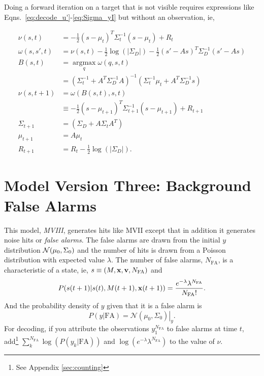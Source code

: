 \documentclass[12pt]{article}
\newcommand{\normal}[2]{{\cal N}(#1,#2)}
\newcommand{\NormalE}[3]{{\mathcal{N}}\left.\left(#1,#2\right)\right|_{#3}}
\newcommand{\ti}[2]{{#1}{(#2)}}                         %
\newcommand{\argmax}{\operatorname*{argmax}}
\begin{document}
Doing a forward iteration on a target that is not visible requires
expressions like Eqns.~\eqref{eq:decode_u'}-\eqref{eq:Sigma_yI} but
without an observation, ie,

\begin{align}
  \nu(s,t) &= -\frac{1}{2}(s-\mu_{t})^T
    \Sigma_{t}^{-1}(s-\mu_{t}) + R_t \nonumber \\
  \omega(s,s',t) &= \nu(s,t) -\frac{1}{2} \log(\left|\Sigma_D\right|)  - 
  \frac{1}{2}(s'-As)^T \Sigma_{D}^{-1} (s'-As)  \nonumber \\
  B(s,t) &= \argmax_{q} \omega(q,s,t) \nonumber \\
  &= \left( \Sigma_t^{-1} + A^T \Sigma_D^{-1} A \right)^{-1} \left(
    \Sigma_t^{-1} \mu_t + A^T \Sigma_D^{-1} s \right) \nonumber \\
  \nu(s,t+1) &= \omega(B(s,t),s,t) \nonumber \\
  &\equiv -\frac{1}{2}(s-\mu_{t+1})^T
  \Sigma_{t+1}^{-1}(s-\mu_{t+1}) + R_{t+1} \nonumber \\
  \label{eq:new_Sigma_noy}
  \Sigma_{t+1} & = \left( \Sigma_D + A \Sigma_tA^T \right) \\
  \label{eq:new_mu_noy}
  \mu_{t+1} &= A \mu_t \\
  \label{eq:new_R_noy}
  R_{t+1} &= R_t -\frac{1}{2}  \log(\left|\Sigma_D\right|).
\end{align}

\section{Model Version Three: Background False Alarms}
\label{sec:model3}

This model, \emph{MVIII}, generates hits like MVII except that in
addition it generates noise hits or \emph{false alarms}.  The false
alarms are drawn from the initial $y$ distribution
$\normal{\mu_0}{\Sigma_0}$ and the number of hits is drawn from a
Poisson distribution with expected value $\lambda$.  The number of
false alarms, $N_{\text{FA}}$, is a characteristic of a state, ie, $s
\equiv (M,{\mathbf{x}},{\mathbf{v}},N_{\text{FA}})$ and
\begin{equation}
  \label{eq:2}
  P(\ti{s}{t+1}|\ti{s}{t},\ti{M}{t+1},\ti{\bx}{t+1}) =
  \frac{e^{-\lambda}\lambda^{N_{\text{FA}}}}{N_{\text{FA}}!}.
\end{equation}
And the probability density of $y$ given that it is a false alarm is
\begin{equation*}
  P(y|\text{FA}) = \NormalE{\mu_0}{\Sigma_0}{y}.
\end{equation*}
For decoding, if you attribute the observations $y_1^{N_{\text{FA}}}$
to false alarms at time $t$, add\footnote{See Appendix
  \ref{sec:counting}} $\sum_k^{N_{\text{FA}}} \log(P(y_k|\text{FA}))$
and $\log \left( e^{-\lambda} \lambda^{N_{\text{FA}}} \right)$ to the
value of $\nu$.
\end{document}
